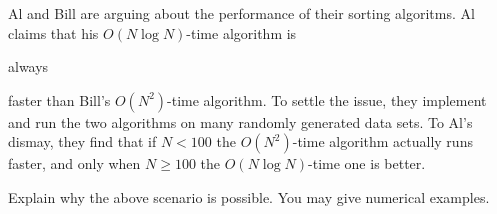 Al and Bill are arguing about the performance of their sorting
algoritms.  Al claims that his $O(N \log  N)$-time algorithm is {\em

always} faster than Bill's $O(N^{2})$-time algorithm.  To settle the
issue, they implement and run the two algorithms on many randomly
generated data sets.  To Al's dismay, they find that if $N < 100$ the
$O(N^{2})$-time algorithm actually runs faster, and only when $N \geq
100$ the $O(N\log  N)$-time one is better.

Explain why the above scenario is possible.  You may give numerical
examples.
